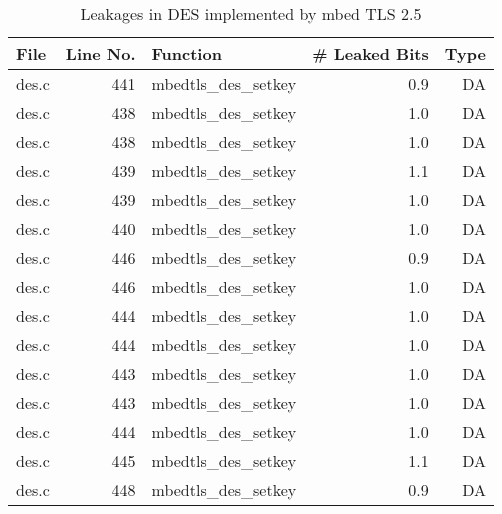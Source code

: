 \begin{table}[h!]
\centering\tiny\scriptsize
\caption{Leakages in DES implemented by mbed TLS 2.5}\label{tab:DESmbed TLS2.5}
\begin{tabular}{lrlrr}
\hline
\textbf{File} & \textbf{Line No.} & \textbf{Function} & \textbf{\# Leaked Bits} & \textbf{Type} \\\hline
des.c& 441&mbedtls\_des\_setkey&0.9 &DA\\
des.c& 438&mbedtls\_des\_setkey&1.0 &DA\\
des.c& 438&mbedtls\_des\_setkey&1.0 &DA\\
des.c& 439&mbedtls\_des\_setkey&1.1 &DA\\
des.c& 439&mbedtls\_des\_setkey&1.0 &DA\\
des.c& 440&mbedtls\_des\_setkey&1.0 &DA\\
des.c& 446&mbedtls\_des\_setkey&0.9 &DA\\
des.c& 446&mbedtls\_des\_setkey&1.0 &DA\\
des.c& 444&mbedtls\_des\_setkey&1.0 &DA\\
des.c& 444&mbedtls\_des\_setkey&1.0 &DA\\
des.c& 443&mbedtls\_des\_setkey&1.0 &DA\\
des.c& 443&mbedtls\_des\_setkey&1.0 &DA\\
des.c& 444&mbedtls\_des\_setkey&1.0 &DA\\
des.c& 445&mbedtls\_des\_setkey&1.1 &DA\\
des.c& 448&mbedtls\_des\_setkey&0.9 &DA\\
\hline
\end{tabular}
\renewcommand{\baselinestretch}{1.0}\selectfont
\end{table}

